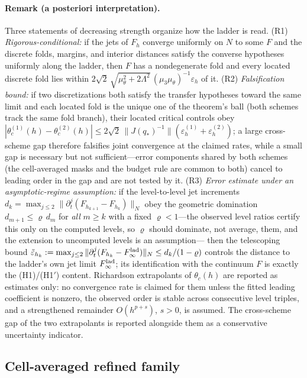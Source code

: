 \documentclass[aps,pre,reprint,amsmath,amssymb,longbibliography,floatfix]{revtex4-2}
\begin{document}
\paragraph{Remark (a posteriori interpretation).}
Three statements of decreasing strength organize how the ladder is read.
(R1) \emph{Rigorous-conditional:} if the jets of \(F_h\) converge uniformly
on \(N\) to some \(F\) and the discrete folds, margins, and interior
distances satisfy the converse hypotheses uniformly along the ladder, then
\(F\) has a nondegenerate fold and every located discrete fold lies within
\(2\sqrt2\,\sqrt{\mu_\theta^2+2\Lambda^2}\,(\mu_3\mu_\theta)^{-1}
\varepsilon_h\) of it.
(R2) \emph{Falsification bound:} if two discretizations both satisfy the
transfer hypotheses toward the same limit and each located fold is the
unique one of the theorem's ball (both schemes track the same fold branch),
their located critical controls obey
\(|\theta_c^{(1)}(h)-\theta_c^{(2)}(h)|
\le2\sqrt2\,\|J(q_*)^{-1}\|(\varepsilon_h^{(1)}+\varepsilon_h^{(2)})\);
a large cross-scheme gap therefore falsifies joint convergence at the
claimed rates, while a small gap is necessary but not sufficient---error
components shared by both schemes (the cell-averaged masks and the budget
rule are common to both) cancel to leading order in the gap and are not
tested by it.
(R3) \emph{Error estimate under an asymptotic-regime assumption:} if the
level-to-level jet increments
\(d_k=\max_{j\le2}\|\partial_t^j(F_{h_{k+1}}-F_{h_k})\|_N\)
obey the geometric domination \(d_{m+1}\le\varrho\,d_m\) for \emph{all}
\(m\ge k\) with a fixed \(\varrho<1\)---the observed level ratios certify
this only on the computed levels, so \(\varrho\) should dominate, not
average, them, and the extension to uncomputed levels is an assumption---
then the telescoping bound
\(\tilde\varepsilon_{h_k}:=\max_{j\le2}\|\partial_t^j(F_{h_k}-F^{\rm lad}_\infty)\|_N
\le d_k/(1-\varrho)\)
controls the distance to the ladder's own jet limit \(F^{\rm lad}_\infty\);
its identification
with the continuum \(F\) is exactly the (H1)/(H1$'$) content. Richardson
extrapolants of \(\theta_c(h)\) are reported as estimates only: no
convergence rate is claimed for them unless the fitted leading coefficient
is nonzero, the observed order is stable across consecutive level triples,
and a strengthened remainder \(O(h^{p+s})\), \(s>0\), is assumed. The
cross-scheme gap of the two extrapolants is reported alongside them as a
conservative uncertainty indicator.

\subsection{Cell-averaged refined family}
\label{sec:refined-family}
\end{document}
